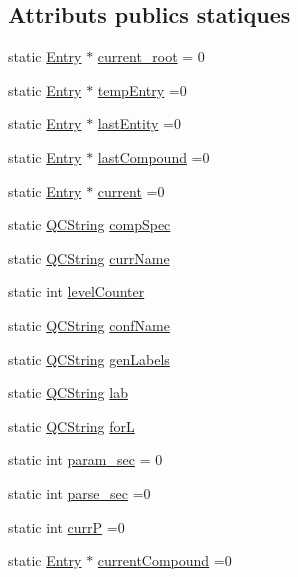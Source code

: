 \subsection*{Attributs publics statiques}
\begin{DoxyCompactItemize}
\item 
static \hyperlink{class_entry}{Entry} $\ast$ \hyperlink{classvhdl_1_1parser_1_1_vhdl_parser_aef26363a4c4134ff22e2b9b238531f09}{current\+\_\+root} = 0
\item 
static \hyperlink{class_entry}{Entry} $\ast$ \hyperlink{classvhdl_1_1parser_1_1_vhdl_parser_a5ae173ce7aa67ef6d3b77afaac50bd08}{temp\+Entry} =0
\item 
static \hyperlink{class_entry}{Entry} $\ast$ \hyperlink{classvhdl_1_1parser_1_1_vhdl_parser_a54372c809720e7a1c7c9890b8e70a0fa}{last\+Entity} =0
\item 
static \hyperlink{class_entry}{Entry} $\ast$ \hyperlink{classvhdl_1_1parser_1_1_vhdl_parser_a51d66ffba0b37d2c0343e31b7be38463}{last\+Compound} =0
\item 
static \hyperlink{class_entry}{Entry} $\ast$ \hyperlink{classvhdl_1_1parser_1_1_vhdl_parser_a7bfcedfeb6c28b2ff636cf136e88f77b}{current} =0
\item 
static \hyperlink{class_q_c_string}{Q\+C\+String} \hyperlink{classvhdl_1_1parser_1_1_vhdl_parser_a8207c85703cef34e9658475ae93b849d}{comp\+Spec}
\item 
static \hyperlink{class_q_c_string}{Q\+C\+String} \hyperlink{classvhdl_1_1parser_1_1_vhdl_parser_aba5fd646a866624fbf5a9ff2d7fb8e52}{curr\+Name}
\item 
static int \hyperlink{classvhdl_1_1parser_1_1_vhdl_parser_a7e300e2e718ee62c9a6ec30aa43d05b2}{level\+Counter}
\item 
static \hyperlink{class_q_c_string}{Q\+C\+String} \hyperlink{classvhdl_1_1parser_1_1_vhdl_parser_acc074e42edc6e707aa452b9fd6d95f64}{conf\+Name}
\item 
static \hyperlink{class_q_c_string}{Q\+C\+String} \hyperlink{classvhdl_1_1parser_1_1_vhdl_parser_a00f4c198682533fc112558693edbd109}{gen\+Labels}
\item 
static \hyperlink{class_q_c_string}{Q\+C\+String} \hyperlink{classvhdl_1_1parser_1_1_vhdl_parser_a8d38501a1d648f05291e19ed09bc712c}{lab}
\item 
static \hyperlink{class_q_c_string}{Q\+C\+String} \hyperlink{classvhdl_1_1parser_1_1_vhdl_parser_a3a3166528cb644ed4aa63717896c74b8}{for\+L}
\item 
static int \hyperlink{classvhdl_1_1parser_1_1_vhdl_parser_a25f544fa6e6df5f6b653dacd8a0b9aa5}{param\+\_\+sec} = 0
\item 
static int \hyperlink{classvhdl_1_1parser_1_1_vhdl_parser_a84ab425ec2f89225d2c362e5721c938c}{parse\+\_\+sec} =0
\item 
static int \hyperlink{classvhdl_1_1parser_1_1_vhdl_parser_a25aa858671fabb47bec4a6ba116af200}{curr\+P} =0
\item 
static \hyperlink{class_entry}{Entry} $\ast$ \hyperlink{classvhdl_1_1parser_1_1_vhdl_parser_a1898e11f45e236b4f245cbcffaa200a5}{current\+Compound} =0
\end{DoxyCompactItemize}

